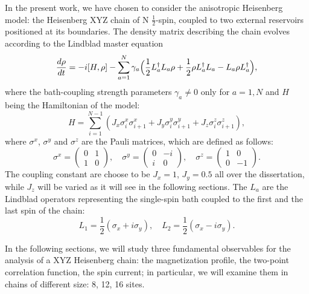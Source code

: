 In the present work, we have chosen to consider the anisotropic Heisenberg model: the Heisenberg XYZ chain of N $\frac{1}{2}$-spin, coupled to two external reservoirs positioned at its boundaries. The density matrix describing the chain evolves according to the Lindblad master equation
\begin{equation}
    \frac{d\rho}{dt} = -i[H, \rho] - \sum_{a=1}^{N}\gamma_a\Bigl(\frac{1}{2}L_a^{\dagger}L_a\rho + \frac{1}{2}\rho L_a^{\dagger}L_a - L_a\rho L_a^{\dagger}\Bigl),
\end{equation}
where the bath-coupling strength parameters $\gamma_a \neq 0$ only for $a = 1, N$ and
$H$ being the Hamiltonian of the model:
\begin{equation}
\label{ham_chain}
    H = \sum_{i = 1}^{N-1} (J_x \sigma_i^x \sigma_{i+1}^x + J_y \sigma_i^y \sigma_{i+1}^y + J_z \sigma_i^z \sigma_{i+1}^z),
\end{equation}
where $\sigma^x$, $\sigma^y$ and $\sigma^z$ are the Pauli matrices, which are defined as follows:
\begin{equation}
\sigma^x = 
    \begin{pmatrix}
        0 & 1 \\
        1 & 0
    \end{pmatrix}
    , \quad \sigma^y = 
    \begin{pmatrix}
        0 & -i \\
        i & 0
    \end{pmatrix}
    , \quad \sigma^z = 
    \begin{pmatrix}
        1 & 0 \\
        0 & -1
    \end{pmatrix}
    .
\end{equation}
The coupling constant are choose to be $J_x = 1$, $J_y = 0.5$ all over the dissertation, while $J_z$ will be varied as it will see in the following sections.
The $L_a$ are the Lindblad operators representing the single-spin bath coupled to the first and the last spin of the chain:
\begin{equation}
\label{dissipators}
    L_1 = \frac{1}{2}(\sigma_x + i\sigma_y), \quad L_2 = \frac{1}{2}(\sigma_x - i\sigma_y).
\end{equation}


In the following sections, we will study three fundamental observables for the analysis of a XYZ Heisenberg chain: the magnetization profile, the two-point correlation function, the spin current; in particular, we will examine them in chains of different size: 8, 12, 16 sites. 

